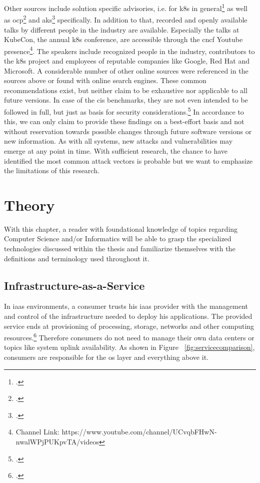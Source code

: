 Other sources include solution specific advisories, i.e. for \gls{k8s} in general\footcite{k8sDocsSecurity} as well as \gls{ocp}\footcite{ocpSecTips} and \gls{aks}\footcite{aksSecTips} specifically. In addition to that, recorded and openly available talks by different people in the industry are available. Especially the talks at KubeCon, the annual \gls{k8s} conference, are accessible through the \gls{cncf} Youtube presence\footnote{Channel Link: https://www.youtube.com/channel/UCvqbFHwN-nwalWPjPUKpvTA/videos}. The speakers include recognized people in the industry, contributors to the \gls{k8s} project and employees of reputable companies like Google, Red Hat and Microsoft.
A considerable number of other online sources were referenced in the sources above or found with online search engines.
These common recommendations exist, but neither claim to be exhaustive nor applicable to all future versions. In case of the \gls{cis} benchmarks, they are not even intended to be followed in full, but just as basis for security considerations.\footcite[][, starting at 29:18]{cisJustRecommendation}
In accordance to this, we can only claim to provide these findings on a best-effort basis and not without reservation towards possible changes through future software versions or new information.
As with all systems, new attacks and vulnerabilities may emerge at any point in time. With sufficient research, the chance to have identified the most common attack vectors is probable but we want to emphasize the limitations of this research.


\chapter{Theory}
With this chapter, a reader with foundational knowledge of topics regarding Computer Science and/or Informatics 
will be able to grasp the specialized technologies discussed within the thesis and familiarize themselves with the definitions and terminology used throughout it.

\section{Infrastructure-as-a-Service}
In \gls{iaas} environments, a consumer trusts his \gls{iaas} provider with the management and control of the infrastructure needed to deploy his applications.
The provided service ends at provisioning of processing, storage, networks and other computing resources.\footcite[][p. 2 to 3]{nistcloud}
Therefore consumers do not need to manage their own data centers or topics like system uplink availability.
As shown in Figure ~\ref{fig:servicecomparison}, consumers are responsible for the \gls{os} layer and everything above it.

